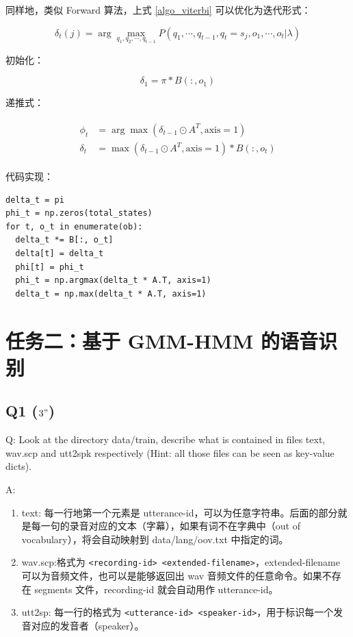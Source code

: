 \documentclass[degree=project,degree-type=project,cjk-font=noto]{thuthesis}
\begin{document}
同样地，类似 Forward 算法，上式 \ref{algo_viterbi} 可以优化为迭代形式：

\begin{equation}
\delta_t (j) = \arg \max_{q_1, q_2, \cdots, q_{t-1}} P(q_1, \cdots, q_{t-1}, q_t=s_j, o_1, \cdots, o_t | \lambda)
\end{equation}

初始化：

\begin{equation}
  \delta_1 = \pi * B(:, o_1)
\end{equation}

递推式：

\begin{align}
  \begin{split}
    \phi_t &= \arg \max(\delta_{t-1} \odot A^T, \text{axis}=1) \\
    \delta_t &= \max(\delta_{t-1} \odot A^T, \text{axis}=1) * B(:, o_t)
  \end{split}
\end{align}

代码实现：

  \begin{verbatim}
delta_t = pi
phi_t = np.zeros(total_states)
for t, o_t in enumerate(ob):
  delta_t *= B[:, o_t]
  delta[t] = delta_t
  phi[t] = phi_t
  phi_t = np.argmax(delta_t * A.T, axis=1)
  delta_t = np.max(delta_t * A.T, axis=1)
  \end{verbatim}

\chapter{任务二：基于 GMM-HMM 的语音识别}

\section{Q1 ($3"$)}

Q: Look at the directory data/train, describe what is contained in files text, wav.scp and utt2spk respectively (Hint: all those files can be seen as key-value dicts).

A:

\begin{enumerate}
  \item text: 每一行地第一个元素是 utterance-id，可以为任意字符串。后面的部分就是每一句的录音对应的文本（字幕），如果有词不在字典中（out of vocabulary），将会自动映射到 data/lang/oov.txt 中指定的词。
  \item wav.scp:格式为 \texttt{<recording-id> <extended-filename>}，extended-filename 可以为音频文件，也可以是能够返回出 wav 音频文件的任意命令。如果不存在 segments 文件，recording-id 就会自动用作 utterance-id。
  \item utt2sp: 每一行的格式为 \texttt{<utterance-id> <speaker-id>}，用于标识每一个发音对应的发音者（speaker）。
\end{enumerate}
\end{document}
